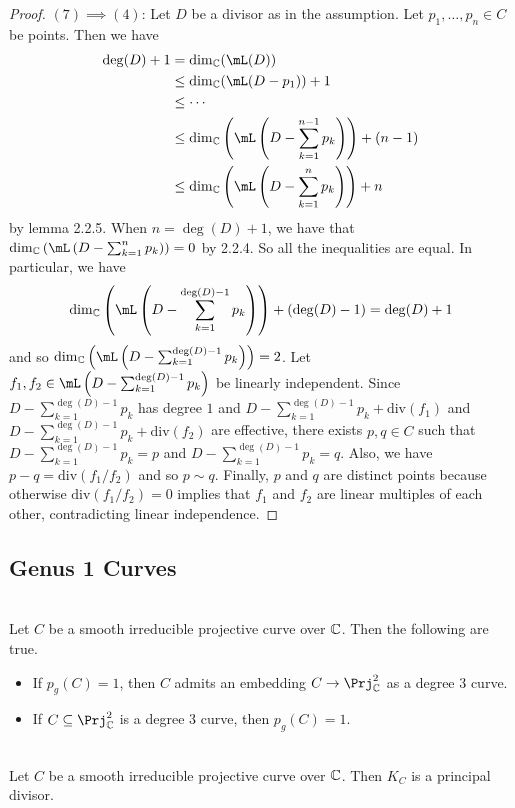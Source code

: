 \documentclass[a4paper]{article}
\begin{document}
\begin{prp}{}{}
\begin{proof}
$(7)\implies(4)$: Let $D$ be a divisor as in the assumption. Let $p_1,\dots,p_n\in C$ be points. Then we have 
\begin{align*}
\deg(D)+1&=\dim_\C(\mL(D))\\
&\leq\dim_\C(\mL(D-p_1))+1\\
&\leq\cdots\\
&\leq\dim_\C\left(\mL\left(D-\sum_{k=1}^{n-1}p_k\right)\right)+(n-1)\\
&\leq\dim_\C\left(\mL\left(D-\sum_{k=1}^np_k\right)\right)+n
\end{align*} by lemma 2.2.5. When $n=\deg(D)+1$, we have that $\dim_\C\left(\mL\left(D-\sum_{k=1}^np_k\right)\right)=0$ by 2.2.4. So all the inequalities are equal. In particular, we have $$\dim_\C\left(\mL\left(D-\sum_{k=1}^{\deg(D)-1}p_k\right)\right)+(\deg(D)-1)=\deg(D)+1$$ and so $\dim_\C\left(\mL\left(D-\sum_{k=1}^{\deg(D)-1}p_k\right)\right)=2$. Let $f_1,f_2\in\mL\left(D-\sum_{k=1}^{\deg(D)-1}p_k\right)$ be linearly independent. Since $D-\sum_{k=1}^{\deg(D)-1}p_k$ has degree $1$ and $D-\sum_{k=1}^{\deg(D)-1}p_k+\text{div}(f_1)$ and $D-\sum_{k=1}^{\deg(D)-1}p_k+\text{div}(f_2)$ are effective, there exists $p,q\in C$ such that $D-\sum_{k=1}^{\deg(D)-1}p_k=p$ and $D-\sum_{k=1}^{\deg(D)-1}p_k=q$. Also, we have $p-q=\text{div}(f_1/f_2)$ and so $p\sim q$. Finally, $p$ and $q$ are distinct points because otherwise $\text{div}(f_1/f_2)=0$ implies that $f_1$ and $f_2$ are linear multiples of each other, contradicting linear independence. 
\end{proof}
\end{prp}

\subsection{Genus 1 Curves}
\begin{prp}{}{}\\
Let $C$ be a smooth irreducible projective curve over $\mathbb{C}$. Then the following are true. 
\begin{itemize}
\item If $p_g(C)=1$, then $C$ admits an embedding $C\to\Prj_\C^2$ as a degree $3$ curve. 
\item If $C\subseteq\Prj_\C^2$ is a degree $3$ curve, then $p_g(C)=1$. 
\end{itemize}
\end{prp}

\begin{lmm}{}{}\\
Let $C$ be a smooth irreducible projective curve over $\mathbb{C}$. Then $K_C$ is a principal divisor. 
\end{lmm}
\end{document}
